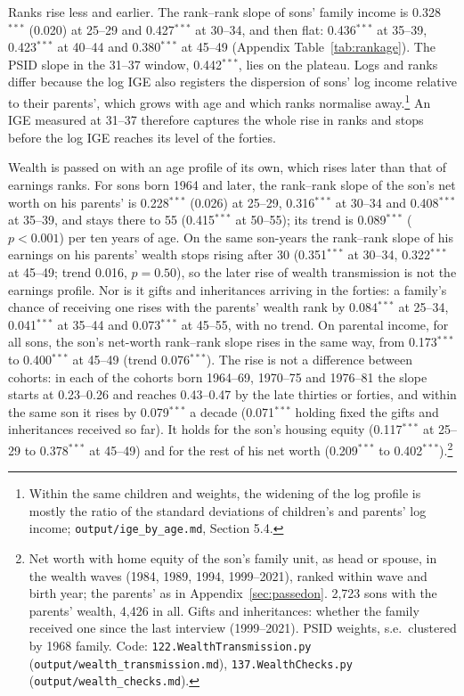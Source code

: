 Ranks rise less and earlier. The rank--rank slope of sons' family income is 0.328$^{***}$ (0.020) at 25--29 and
0.427$^{***}$ at 30--34, and then flat: 0.436$^{***}$ at 35--39, 0.423$^{***}$ at 40--44 and 0.380$^{***}$ at 45--49
(Appendix Table~\ref{tab:rankage}). The PSID slope in the 31--37 window, 0.442$^{***}$, lies on the plateau. Logs and
ranks differ because the log IGE also registers the dispersion of sons' log income relative to their parents', which
grows with age and which ranks normalise away.\footnote{Within the same children and weights, the widening of the
log profile is mostly the ratio of the standard deviations of children's and parents' log income;
\texttt{output/ige\_by\_age.md}, Section 5.4.} An IGE measured at 31--37 therefore captures the whole rise in ranks and
stops before the log IGE reaches its level of the forties.

Wealth is passed on with an age profile of its own, which rises later than that of earnings ranks. For sons born 1964
and later, the rank--rank slope of the son's net worth on his parents' is 0.228$^{***}$ (0.026) at 25--29,
0.316$^{***}$ at 30--34 and 0.408$^{***}$ at 35--39, and stays there to 55 (0.415$^{***}$ at 50--55); its trend is
0.089$^{***}$ ($p<0.001$) per ten years of age. On the same son-years the rank--rank slope of his earnings on his
parents' wealth stops rising after 30 (0.351$^{***}$ at 30--34, 0.322$^{***}$ at 45--49; trend 0.016, $p = 0.50$), so the
later rise of wealth transmission is not the earnings profile. Nor is it gifts and inheritances arriving in the
forties: a family's chance of receiving one rises with the parents' wealth rank by 0.084$^{***}$ at 25--34, 0.041$^{***}$
at 35--44 and 0.073$^{***}$ at 45--55, with no trend. On parental income, for all sons, the son's net-worth rank--rank
slope rises in the same way, from 0.173$^{***}$ to 0.400$^{***}$ at 45--49 (trend 0.076$^{***}$). The rise is not a
difference between cohorts: in each of the cohorts born 1964--69, 1970--75 and 1976--81 the slope starts at 0.23--0.26
and reaches 0.43--0.47 by the late thirties or forties, and within the same son it rises by 0.079$^{***}$ a decade
(0.071$^{***}$ holding fixed the gifts and inheritances received so far). It holds for the son's housing equity
(0.117$^{***}$ at 25--29 to 0.378$^{***}$ at 45--49) and for the rest of his net worth (0.209$^{***}$ to
0.402$^{***}$).\footnote{Net worth
with home equity of the son's family unit, as head or spouse, in the wealth waves (1984, 1989, 1994, 1999--2021),
ranked within wave and birth year; the parents' as in Appendix~\ref{sec:passedon}. 2,723 sons with the parents' wealth,
4,426 in all. Gifts and inheritances: whether the family received one since the last interview (1999--2021). PSID
weights, s.e.\ clustered by 1968 family. Code: \texttt{122.WealthTransmission.py}
(\texttt{output/wealth\_transmission.md}), \texttt{137.WealthChecks.py} (\texttt{output/wealth\_checks.md}).}

